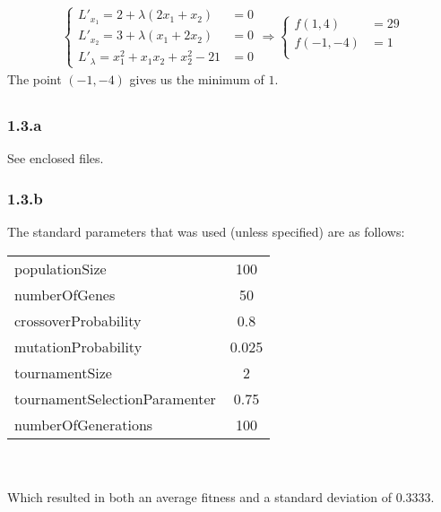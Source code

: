 \documentclass{article}
\begin{document}
\begin{align*}
  \begin{cases}
    L'_{x_1} = 2 + \lambda (2x_1 + x_2) &= 0 \\
    L'_{x_2} = 3 + \lambda (x_1 + 2x_2) &= 0 \\
    L'_{\lambda} = x_1^2 + x_1 x_2 + x_2^2 - 21 &= 0
  \end{cases}
  \Rightarrow
  \begin{cases}
    f(1, 4) &= 29 \\
    f(-1, -4) &= 1 \\
  \end{cases}
\end{align*}
The point $(-1, -4)$ gives us the minimum of $1$.

\subsection{}
\subsubsection*{1.3.a}

See enclosed files.

\subsubsection*{1.3.b}

The standard parameters that was used (unless specified) are as follows: \\
\begin{tabular}{l | c}
  populationSize                & 100\\
  numberOfGenes                 & 50\\
  crossoverProbability          & 0.8\\
  mutationProbability           & 0.025\\
  tournamentSize                & 2\\
  tournamentSelectionParamenter & 0.75\\
  numberOfGenerations           & 100\\
\end{tabular}\\\\
Which resulted in both an average fitness and a standard deviation of 0.3333.
\end{document}
